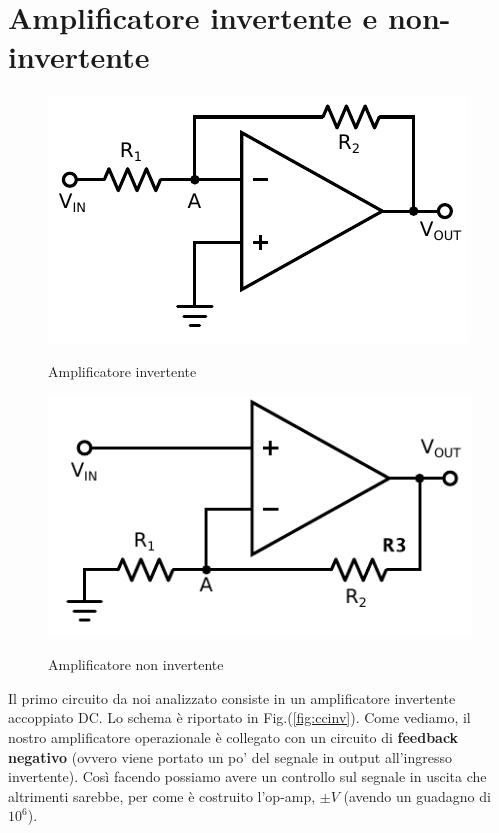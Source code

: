 \section{Amplificatore invertente e non-invertente}

\begin{figure}[h!]
\centering
		\begin{minipage}[c]{.4\textwidth}
			\centering

			\includegraphics[width=.65\textwidth]{ccinv.pdf}
			\label{fig:ccinv}
			\caption{Amplificatore invertente}

		\end{minipage}%
		\hspace{10mm}%
		\begin{minipage}[c]{.4\textwidth}
			\centering

			\includegraphics[width=.65\textwidth]{ccninv.pdf}
			\label{fig:ccninv}
			\caption{Amplificatore non invertente}
			
		\end{minipage}
\end{figure}

Il primo circuito da noi analizzato consiste in un amplificatore invertente accoppiato DC.
Lo schema è riportato in Fig.(\ref{fig:ccinv}).
Come vediamo, il nostro amplificatore operazionale è collegato con un circuito di \textbf{feedback} \textbf{negativo} (ovvero viene portato un po' del segnale in output all'ingresso invertente).
Così facendo possiamo avere un controllo sul segnale in uscita che altrimenti sarebbe, per come è costruito l'op-amp, $\pm V$ (avendo un guadagno di $10^6$).

